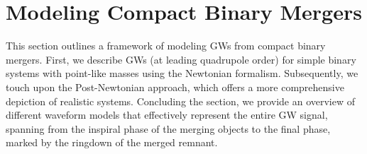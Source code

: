 \begin{itemize}

\end{itemize}




\section{Modeling Compact Binary Mergers}
This section outlines a framework of modeling GWs from compact binary mergers. First, we describe GWs (at leading quadrupole order) for simple binary systems with point-like masses using the Newtonian formalism. Subsequently, we touch upon the Post-Newtonian approach, which offers a more comprehensive depiction of realistic systems. Concluding the section, we provide an overview of different waveform models that effectively represent the entire GW signal, spanning from the inspiral phase of the merging objects to the final phase, marked by the ringdown of the merged remnant.

